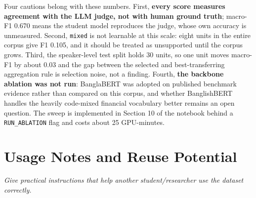 \documentclass[11pt,a4paper]{article}
\begin{document}
Four cautions belong with these numbers. First, \textbf{every score measures agreement with the LLM
judge, not with human ground truth}; macro-F1 0.670 means the student model reproduces the judge,
whose own accuracy is unmeasured. Second, \texttt{mixed} is not learnable at this scale: eight units
in the entire corpus give F1 0.105, and it should be treated as unsupported until the corpus grows.
Third, the speaker-level test split holds 30 units, so one unit moves macro-F1 by about 0.03 and the
gap between the selected and best-transferring aggregation rule is selection noise, not a finding.
Fourth, \textbf{the backbone ablation was not run}: BanglaBERT was adopted on published benchmark
evidence rather than compared on this corpus, and whether BanglishBERT handles the heavily
code-mixed financial vocabulary better remains an open question. The sweep is implemented in
Section 10 of the notebook behind a \texttt{RUN\_ABLATION} flag and costs about 25 GPU-minutes.

\section{Usage Notes and Reuse Potential}

\emph{\small Give practical instructions that help another student/researcher use the dataset
correctly.}
\end{document}
